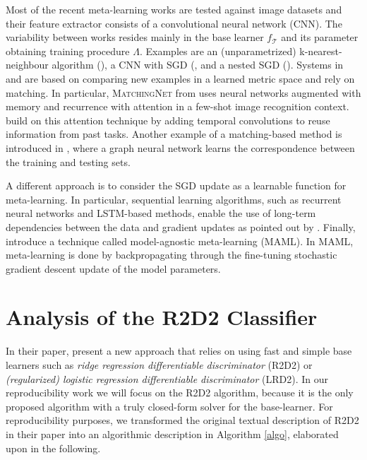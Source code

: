 Most of the recent meta-learning works are tested against image datasets and their feature extractor consists of a convolutional neural network (CNN). The variability between works resides mainly in the base learner $f_\mathcal{T}$ and its parameter obtaining training procedure $\Lambda$. Examples are an (unparametrized) k-nearest-neighbour algorithm (\citet{vinyals}), a CNN with SGD (\citet{mishra}, and a nested SGD (\citet{finn}). Systems in \citet{vinyals} and \citet{snell} are based on comparing new examples in a learned metric space and rely on matching. In particular, \textsc{MatchingNet} from \citet{vinyals} uses neural networks augmented with memory and recurrence with attention in a few-shot image recognition context. \citet{mishra} build on this attention technique by adding temporal convolutions to reuse information from past tasks. Another example of a matching-based method is introduced in \citet{garcia}, where a graph neural network learns the correspondence between the training and testing sets.

A different approach is to consider the SGD update as a learnable function for meta-learning. In particular, sequential learning algorithms, such as recurrent neural networks and LSTM-based methods, enable the use of long-term dependencies between the data and gradient updates as pointed out by \citet{ravi}. Finally, \citet{finn} introduce a technique called model-agnostic meta-learning (MAML). In MAML, meta-learning is done by backpropagating through the fine-tuning stochastic gradient descent update of the model parameters.

\section{Analysis of the R2D2 Classifier}
\label{Anal}
In their paper, \citet{R2D2} present a new approach that relies on using fast and simple base learners such as \textit{ridge regression differentiable discriminator} (R2D2) or \textit{(regularized) logistic regression differentiable discriminator} (LRD2). In our reproducibility work we will focus on the R2D2 algorithm, because it is the only proposed algorithm with a truly closed-form solver for the base-learner. For reproducibility purposes, we transformed the original textual description of R2D2 in their paper into an algorithmic description in Algorithm \ref{algo}, elaborated upon in the following.

